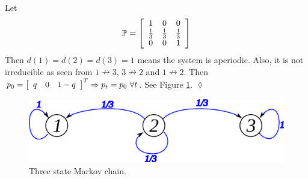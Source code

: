 \begin{example}
Let
$$\mathbb{P} = \left[\begin{array}{c c c} 1 & 0 & 0 \\ \frac{1}{3} & \frac{1}{3} & \frac{1}{3} \\ 0 & 0 & 1 \end{array}\right]$$
Then $d(1)=d(2)=d(3)=1$ means the system is aperiodic. Also, it is not irreducible as seen from $1\nrightarrow 3$, $3\nrightarrow 2$ and $1\nrightarrow 2$. Then $p_0=\left[\begin{array}{c c c} q & 0 & 1-q \end{array}\right]^T \Rightarrow p_t=p_0 ~\forall t$. See Figure \ref{fig:10mc3a}.
$\lozenge$
\end{example}

\begin{figure}[ht!]
	\centering
	\includegraphics[width=.4\textwidth]{images/10mc3a}
	\caption{Three state Markov chain.}
	\label{fig:10mc3a}
\end{figure}


